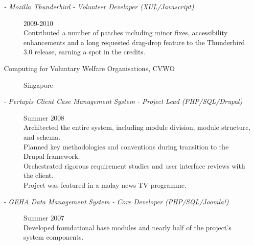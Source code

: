 \documentclass[a4paper]{article}
\begin{document}
\begin{llist}
\begin{description}
\item[ \textit { - Mozilla Thunderbird - Volunteer Developer (XUL/Javascript) } \ ] \hfill
2009-2010 \\
Contributed a number of patches including minor fixes, accessibility enhancements and a long requested
drag-drop feature to the Thunderbird 3.0 release, earning a spot in the credits.\\

\item[Computing for Voluntary Welfare Organisations, CVWO \ ] \hfill
Singapore
\item [ - \textit{Pertapis Client Case Management System - Project Lead (PHP/SQL/Drupal) } ] \hfill
Summer 2008\\
Architected the entire system, including module division, module structure, and schema.\\
Planned key methodologies and conventions during transition to the Drupal framework.\\
Orchestrated rigorous requirement studies and user interface reviews with the client.\\
Project was featured in a malay news TV programme.
\item[ - \textit{GEHA Data Management System - Core Developer (PHP/SQL/Joomla!) } ] \hfill
Summer 2007\\
Developed foundational base modules and nearly half of the project's
system components.\\

\end{description}


\end{llist}
\end{document}
